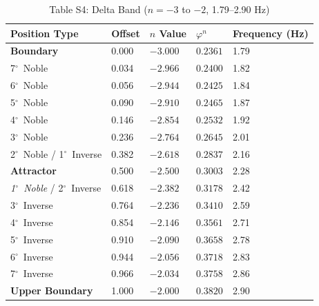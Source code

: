 \documentclass[11pt,a4paper]{article}
\newcommand{\degree}{$^\circ$}  %
\begin{document}
\begin{table}[H]
\centering
\caption*{Table S4: Delta Band ($n = -3$ to $-2$, 1.79--2.90 Hz)}
\begin{tabular}{@{}lllll@{}}
\toprule
Position Type & Offset & $n$ Value & $\varphi^n$ & Frequency (Hz) \\
\midrule
\textbf{Boundary} & 0.000 & $-3.000$ & $0.2361$ & 1.79 \\
7\degree\ Noble & 0.034 & $-2.966$ & $0.2400$ & 1.82 \\
6\degree\ Noble & 0.056 & $-2.944$ & $0.2425$ & 1.84 \\
5\degree\ Noble & 0.090 & $-2.910$ & $0.2465$ & 1.87 \\
4\degree\ Noble & 0.146 & $-2.854$ & $0.2532$ & 1.92 \\
3\degree\ Noble & 0.236 & $-2.764$ & $0.2645$ & 2.01 \\
2\degree\ Noble / 1\degree\ Inverse & 0.382 & $-2.618$ & $0.2837$ & 2.16 \\
\textbf{Attractor} & 0.500 & $-2.500$ & $0.3003$ & 2.28 \\
\textit{1\degree\ Noble} / 2\degree\ Inverse & 0.618 & $-2.382$ & $0.3178$ & 2.42 \\
3\degree\ Inverse & 0.764 & $-2.236$ & $0.3410$ & 2.59 \\
4\degree\ Inverse & 0.854 & $-2.146$ & $0.3561$ & 2.71 \\
5\degree\ Inverse & 0.910 & $-2.090$ & $0.3658$ & 2.78 \\
6\degree\ Inverse & 0.944 & $-2.056$ & $0.3718$ & 2.83 \\
7\degree\ Inverse & 0.966 & $-2.034$ & $0.3758$ & 2.86 \\
\textbf{Upper Boundary} & 1.000 & $-2.000$ & $0.3820$ & 2.90 \\
\bottomrule
\end{tabular}
\end{table}
\end{document}
